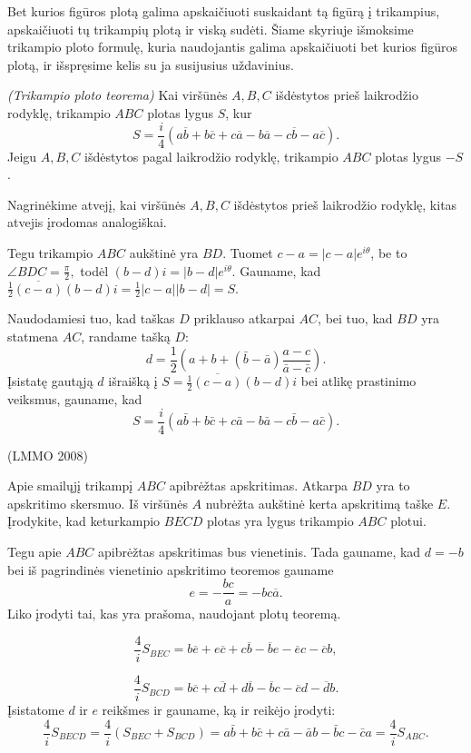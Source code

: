 \documentclass[11pt,a4paper,twoside]{book}
\begin{document}
Bet kurios figūros plotą galima apskaičiuoti suskaidant tą figūrą į trikampius, apskaičiuoti tų trikampių plotą ir viską sudėti. Šiame skyriuje išmoksime trikampio ploto formulę, kuria naudojantis galima apskaičiuoti bet kurios figūros plotą, ir išspręsime kelis su ja susijusius uždavinius.

\begin{thmnr} \textit{(Trikampio ploto teorema)}
Kai viršūnės $A, B, C$ išdėstytos prieš laikrodžio rodyklę, trikampio $ABC$ plotas lygus $S$, kur 
$$S=\frac{i}{4}(a\overline{b} +b\overline{c}+c\overline{a} - b\overline{a} -c\overline{b}-a\overline{c}).$$
Jeigu $A, B, C$ išdėstytos pagal laikrodžio rodyklę, trikampio $ABC$ plotas lygus $-S$.
\end{thmnr}

\begin{sprendimas}
Nagrinėkime atvejį, kai viršūnės $A, B, C$ išdėstytos prieš laikrodžio rodyklę, kitas atvejis įrodomas analogiškai.

Tegu trikampio $ABC$ aukštinė yra $BD$. Tuomet $c-a=|c-a|e^{i\theta}$, be to $\angle BDC = \frac {\pi}{2},$ todėl $(b-d)i=|b-d|e^{i\theta}$. Gauname, kad $\frac{1}{2}\overline{(c-a)} (b-d)i=\frac{1}{2}|c-a||b-d|=S.$

Naudodamiesi tuo, kad taškas $D$ priklauso atkarpai $AC$, bei tuo, kad $BD$ yra statmena $AC$, randame tašką $D$:
$$ d =\frac {1}{2}(a+b + (\bar{b}-\bar{a}) \frac{a-c}{ \bar{a}-\bar{c}}).$$
Įsistatę gautąją $d$ išraišką į $S=\frac{1}{2}\overline{(c-a)} (b-d)i$ bei atlikę prastinimo veiksmus, gauname, kad
$$S= \frac {i}{4}(a\bar{b}+ b \bar{c} + c \bar{a} - b\bar{a} - c \bar{b} - a \bar{c}).$$
\end{sprendimas}



\begin{pavnr}
(LMMO 2008)

Apie smailųjį trikampį $ABC$ apibrėžtas apskritimas. Atkarpa $BD$ yra to
apskritimo skersmuo. Iš viršūnės $A$ nubrėžta aukštinė kerta apskritimą
taške $E$. Įrodykite, kad keturkampio $BECD$ plotas yra lygus trikampio
$ABC$ plotui.
\end{pavnr}
\begin{sprendimas}
Tegu apie $ABC$ apibrėžtas apskritimas bus vienetinis. Tada gauname, kad $d = -b$ bei iš pagrindinės vienetinio apskritimo teoremos gauname
 $$ e= -\frac {bc}{a}= -bc \overline{a}.$$
Liko įrodyti tai, kas yra prašoma, naudojant plotų teoremą.

$$\frac{4}{i}S_{BEC}=b\overline{e}+e\overline{c}+c\overline{b}-\overline{b}e-\overline{e}c-\overline{c}b,$$

$$\frac{4}{i}S_{BCD}=b\overline{c}+c\overline{d}+d\overline{b}-\overline{b}c-\overline{c}d-\overline{d}b.$$
Įsistatome $d$ ir $e$ reikšmes ir gauname, ką ir reikėjo įrodyti:
$$ \frac{4}{i}S_{BECD}=\frac{4}{i}(S_{BEC}+S_{BCD})=   
a\bar b + b \bar c + c \bar a - \bar a b - \bar b c - \bar c a = \frac{4}{i}S_{ABC}.$$
\end{sprendimas}
\end{document}
